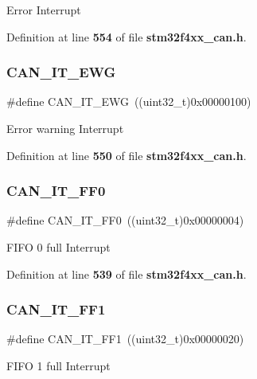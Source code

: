 Error Interrupt 

Definition at line \textbf{ 554} of file \textbf{ stm32f4xx\+\_\+can.\+h}.

\mbox{\label{group__CAN__interrupts_ga8a9f04ddf6ebe169d32b951a8ea135b3}} 
\subsubsection{C\+A\+N\+\_\+\+I\+T\+\_\+\+E\+WG}
{\footnotesize\ttfamily \#define C\+A\+N\+\_\+\+I\+T\+\_\+\+E\+WG~((uint32\+\_\+t)0x00000100)}

Error warning Interrupt 

Definition at line \textbf{ 550} of file \textbf{ stm32f4xx\+\_\+can.\+h}.

\mbox{\label{group__CAN__interrupts_gabf63043d9216de80ddc7ffe57b23ef67}} 
\subsubsection{C\+A\+N\+\_\+\+I\+T\+\_\+\+F\+F0}
{\footnotesize\ttfamily \#define C\+A\+N\+\_\+\+I\+T\+\_\+\+F\+F0~((uint32\+\_\+t)0x00000004)}

F\+I\+FO 0 full Interrupt 

Definition at line \textbf{ 539} of file \textbf{ stm32f4xx\+\_\+can.\+h}.

\mbox{\label{group__CAN__interrupts_ga93b86d884ce0624b4b36c991fd75fc1c}} 
\subsubsection{C\+A\+N\+\_\+\+I\+T\+\_\+\+F\+F1}
{\footnotesize\ttfamily \#define C\+A\+N\+\_\+\+I\+T\+\_\+\+F\+F1~((uint32\+\_\+t)0x00000020)}

F\+I\+FO 1 full Interrupt 

